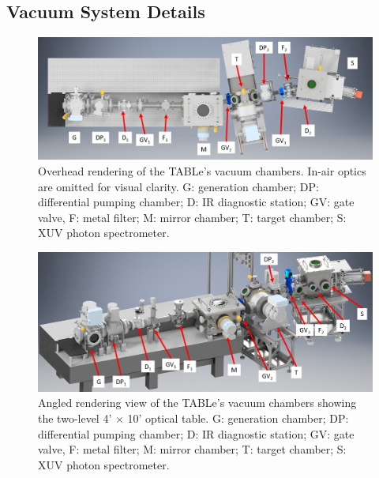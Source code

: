 \subsection{Vacuum System Details}

\begin{figure}
	\centering
	\includegraphics[width=1.0\textwidth]{figures/chap2/TABLe assembly - overhead labeled.png}
	\caption{Overhead rendering of the TABLe's vacuum chambers. In-air optics are omitted for visual clarity. G: generation chamber; DP: differential pumping chamber; D: IR diagnostic station; GV: gate valve, F: metal filter; M: mirror chamber; T: target chamber; S: XUV photon spectrometer.}
	\label{fig:TABLE_overhead_drawing}
\end{figure}

\begin{figure}
	\centering
	\includegraphics[width=1.0\textwidth]{figures/chap2/TABLe assembly - angled labeled.png}
	\caption{Angled rendering view of the TABLe's vacuum chambers showing the two-level 4' $\times$ 10' optical table. G: generation chamber; DP: differential pumping chamber; D: IR diagnostic station; GV: gate valve, F: metal filter; M: mirror chamber; T: target chamber; S: XUV photon spectrometer.}
	\label{fig:TABLE_angled_drawing}
\end{figure}


